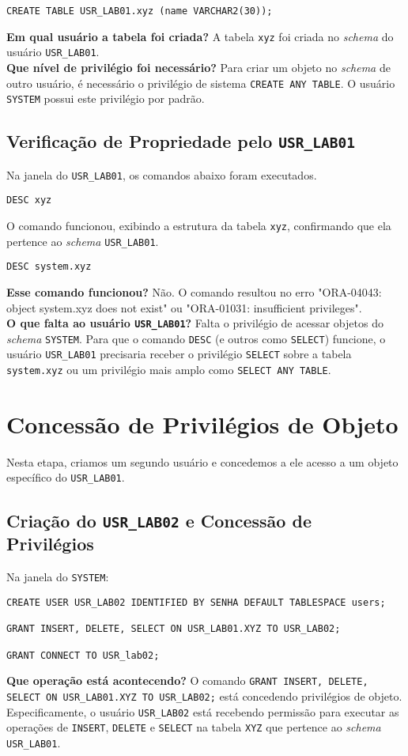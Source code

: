 \documentclass[a4paper, 12pt]{article}
\begin{document}
\begin{lstlisting}
CREATE TABLE USR_LAB01.xyz (name VARCHAR2(30));
\end{lstlisting}
\textbf{Em qual usuário a tabela foi criada?} A tabela \texttt{xyz} foi criada no \textit{schema} do usuário \texttt{USR\_LAB01}.\\
\textbf{Que nível de privilégio foi necessário?} Para criar um objeto no \textit{schema} de outro usuário, é necessário o privilégio de sistema \texttt{CREATE ANY TABLE}. O usuário \texttt{SYSTEM} possui este privilégio por padrão.

\subsection{Verificação de Propriedade pelo \texttt{USR\_LAB01}}
Na janela do \texttt{USR\_LAB01}, os comandos abaixo foram executados.
\begin{lstlisting}
DESC xyz
\end{lstlisting}
O comando funcionou, exibindo a estrutura da tabela \texttt{xyz}, confirmando que ela pertence ao \textit{schema} \texttt{USR\_LAB01}.

\begin{lstlisting}
DESC system.xyz
\end{lstlisting}
\textbf{Esse comando funcionou?} Não. O comando resultou no erro "ORA-04043: object system.xyz does not exist" ou "ORA-01031: insufficient privileges".\\
\textbf{O que falta ao usuário \texttt{USR\_LAB01}?} Falta o privilégio de acessar objetos do \textit{schema} \texttt{SYSTEM}. Para que o comando \texttt{DESC} (e outros como \texttt{SELECT}) funcione, o usuário \texttt{USR\_LAB01} precisaria receber o privilégio \texttt{SELECT} sobre a tabela \texttt{system.xyz} ou um privilégio mais amplo como \texttt{SELECT ANY TABLE}.

\section{Concessão de Privilégios de Objeto}
Nesta etapa, criamos um segundo usuário e concedemos a ele acesso a um objeto específico do \texttt{USR\_LAB01}.

\subsection{Criação do \texttt{USR\_LAB02} e Concessão de Privilégios}
Na janela do \texttt{SYSTEM}:
\begin{lstlisting}
CREATE USER USR_LAB02 IDENTIFIED BY SENHA DEFAULT TABLESPACE users;

GRANT INSERT, DELETE, SELECT ON USR_LAB01.XYZ TO USR_LAB02;

GRANT CONNECT TO USR_lab02;
\end{lstlisting}
\textbf{Que operação está acontecendo?} O comando \texttt{GRANT INSERT, DELETE, SELECT ON USR\_LAB01.XYZ TO USR\_LAB02;} está concedendo privilégios de objeto. Especificamente, o usuário \texttt{USR\_LAB02} está recebendo permissão para executar as operações de \texttt{INSERT}, \texttt{DELETE} e \texttt{SELECT} na tabela \texttt{XYZ} que pertence ao \textit{schema} \texttt{USR\_LAB01}.
\end{document}

